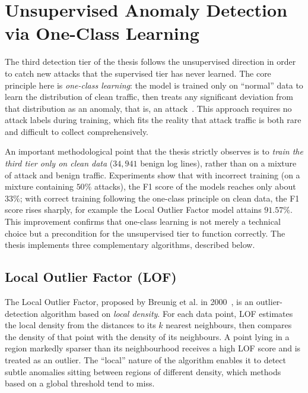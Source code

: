 \documentclass[../main.tex]{subfiles}
\begin{document}
\section{Unsupervised Anomaly Detection via One-Class Learning}
\label{sec:unsup}

The third detection tier of the thesis follows the unsupervised direction
in order to catch new attacks that the supervised tier has never learned.
The core principle here is \emph{one-class learning}: the model is trained
only on ``normal'' data to learn the distribution of clean traffic, then
treats any significant deviation from that distribution as an anomaly, that
is, an attack~\cite{scholkopf1999}. This approach requires no attack labels
during training, which fits the reality that attack traffic is both rare
and difficult to collect comprehensively.

An important methodological point that the thesis strictly observes is to
\emph{train the third tier only on clean data} ($34{,}941$ benign log
lines), rather than on a mixture of attack and benign traffic. Experiments
show that with incorrect training (on a mixture containing $50\%$ attacks),
the F1 score of the models reaches only about $33\%$; with correct training
following the one-class principle on clean data, the F1 score rises sharply,
for example the Local Outlier Factor model attains $91.57\%$. This
improvement confirms that one-class learning is not merely a technical
choice but a precondition for the unsupervised tier to function correctly.
The thesis implements three complementary algorithms, described below.

\subsection{Local Outlier Factor (LOF)}

The Local Outlier Factor, proposed by Breunig et al. in
2000~\cite{breunig2000}, is an outlier-detection algorithm based on
\emph{local density}. For each data point, LOF estimates the local density
from the distances to its $k$ nearest neighbours, then compares the density
of that point with the density of its neighbours. A point lying in a region
markedly sparser than its neighbourhood receives a high LOF score and is
treated as an outlier. The ``local'' nature of the algorithm enables it to
detect subtle anomalies sitting between regions of different density, which
methods based on a global threshold tend to miss.
\end{document}
